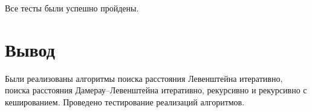 Все тесты были успешно пройдены.



\section*{Вывод}

Были реализованы алгоритмы поиска расстояния Левенштейна итеративно, поиска расстояния Дамерау–Левенштейна итеративно, рекурсивно и рекурсивно с кешированием. Проведено тестирование реализаций алгоритмов.
